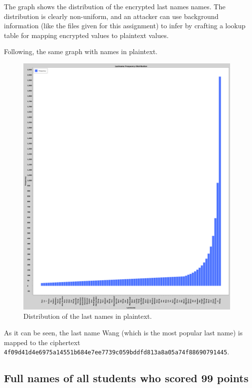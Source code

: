 The graph shows the distribution of the encrypted last names names. The distribution is clearly non-uniform, and an attacker can use background information (like the files given for this assignment) to infer by crafting a lookup table for mapping encrypted values to plaintext values.

Following, the same graph with names in plaintext.

\begin{figure}[H]
    \centering
    \includegraphics[width=\textwidth]{03-ex2/Lastname_Frequency_Distribution_Plain.png}
    \caption{Distribution of the last names in plaintext.}
    \label{fig:Distribution-of-last-names-plain}
\end{figure}

As it can be seen, the last name Wang (which is the most popular last name) is mapped to the ciphertext \\ \texttt{4f09d41d4e6975a14551b684e7ee7739c059bddfd813a8a05a74f88690791445}.

\newpage
\subsection{Full names of all students who scored 99 points}

